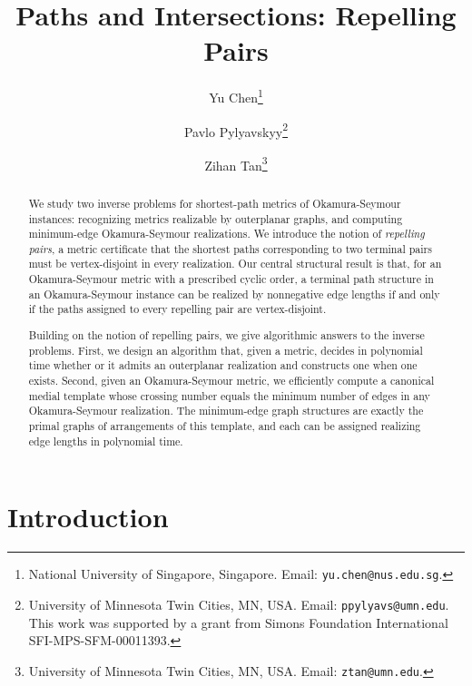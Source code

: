 \documentclass[11pt]{article}
\begin{document}
\begin{titlepage}
\title{Paths and Intersections: Repelling Pairs}
\author{Yu Chen\thanks{National University of Singapore, Singapore. Email: {\tt yu.chen@nus.edu.sg}.}
\and Pavlo Pylyavskyy\thanks{University of Minnesota Twin Cities, MN, USA. Email: {\tt ppylyavs@umn.edu}. This work was supported by a grant from Simons Foundation International SFI-MPS-SFM-00011393.}
\and Zihan Tan\thanks{University of Minnesota Twin Cities, MN, USA. Email: {\tt ztan@umn.edu}.}}

\maketitle
\thispagestyle{empty}
\begin{abstract}
We study two inverse problems for shortest-path metrics of Okamura-Seymour instances: recognizing metrics realizable by outerplanar graphs, and computing
minimum-edge Okamura-Seymour realizations. We introduce the notion of \emph{repelling
pairs}, a metric certificate that the shortest paths corresponding to two
terminal pairs must be vertex-disjoint in every realization. Our central
structural result is that, for an Okamura-Seymour metric with a prescribed cyclic order, a terminal path structure in an Okamura-Seymour instance can be
realized by nonnegative edge lengths if and only if the paths assigned to
every repelling pair are vertex-disjoint. 

Building on the notion of repelling pairs, we give algorithmic answers to the inverse problems. First, we design an algorithm that, given a metric, decides in polynomial time whether or it admits an outerplanar
realization and constructs one when one exists. 
Second, given an Okamura-Seymour metric,
we efficiently compute a canonical medial template whose crossing number equals the minimum number of edges in any Okamura-Seymour realization. The minimum-edge graph structures are exactly the primal graphs of arrangements of this template, and each can be assigned realizing edge lengths in polynomial time.


\end{abstract}

\end{titlepage}

\tableofcontents
\newpage

\section{Introduction}\label{sec:introduction}
\end{document}
